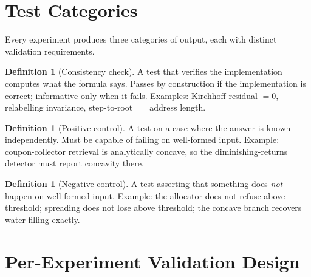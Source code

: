 \documentclass[11pt,a4paper]{article}
\theoremstyle{planstyle}
\theoremstyle{definition}
\newtheorem{definition}[theorem]{Definition}
\theoremstyle{remark}
\begin{document}
\section{Test Categories}
\label{sec:test-categories}

Every experiment produces three categories of output, each with
distinct validation requirements.

\begin{definition}[Consistency check]
A test that verifies the implementation computes what the formula says.
Passes by construction if the implementation is correct; informative
only when it fails. Examples: Kirchhoff residual $= 0$, relabelling
invariance, step-to-root $=$ address length.
\end{definition}

\begin{definition}[Positive control]
A test on a case where the answer is known independently. Must be
capable of failing on well-formed input. Example: coupon-collector
retrieval is analytically concave, so the diminishing-returns detector
must report concavity there.
\end{definition}

\begin{definition}[Negative control]
A test asserting that something does \emph{not} happen on well-formed
input. Example: the allocator does not refuse above threshold; spreading
does not lose above threshold; the concave branch recovers water-filling
exactly.
\end{definition}

\section{Per-Experiment Validation Design}
\label{sec:per-exp-validation}
\end{document}
